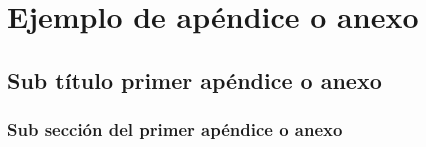 
\appendix

\chapter{Ejemplo de apéndice o anexo}

\section{Sub título primer apéndice o anexo}



\subsection{Sub sección del primer apéndice o anexo}


